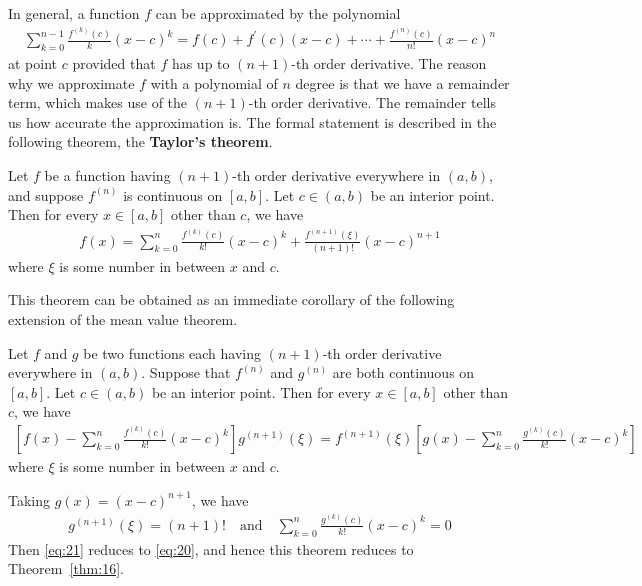 \documentclass[thmcnt=section, 12pt]{my-elegantbook}
\begin{document}

In general, a function $f$ can be approximated by the polynomial
\begin{align*}
    \sum_{k=0}^{n-1} \frac{f^{(k)}(c)}{k}(x-c)^k
    = f(c) + f^\prime(c)(x-c) + \cdots + \frac{f^{(n)}(c)}{n!} (x-c)^{n}
\end{align*}
at point $c$ provided that $f$ has up to $(n+1)$-th order derivative. The reason why we approximate $f$ with a polynomial of $n$ degree is that we have a remainder term, which makes use of the $(n+1)$-th order derivative. The remainder tells us how accurate the approximation is. The formal statement is described in the following theorem, the \textbf{Taylor's theorem}.

\begin{theorem}[Taylor] \label{thm:16}
    Let $f$ be a function having $(n+1)$-th order derivative everywhere in $(a, b)$, and suppose $f^{(n)}$ is continuous on $[a, b]$. Let $c \in (a, b)$ be an interior point. Then for every $x \in [a, b]$ other than $c$, we have 
    \begin{align}
        f(x) = \sum_{k=0}^{n} \frac{f^{(k)}(c)}{k!}(x-c)^k + \frac{f^{(n+1)}(\xi)}{(n+1)!} (x-c)^{n+1}
        \label{eq:20}
    \end{align}
    where $\xi$ is some number in between $x$ and $c$.
\end{theorem}

\par This theorem can be obtained as an immediate corollary of the following extension of the mean value theorem.

\begin{theorem} \label{thm:17}
    Let $f$ and $g$ be two functions each having $(n+1)$-th order derivative everywhere in $(a, b)$. Suppose that $f^{(n)}$ and $g^{(n)}$ are both continuous on $[a, b]$. Let $c \in (a, b)$ be an interior point. Then for every $x \in [a, b]$ other than $c$, we have 
    \begin{align}
        \left[
            f(x) - \sum_{k=0}^{n} \frac{f^{(k)}(c)}{k!}(x-c)^k
        \right] g^{(n+1)}(\xi)
        = f^{(n+1)}(\xi) \left[
            g(x) - \sum_{k=0}^{n} \frac{g^{(k)}(c)}{k!}(x-c)^k
        \right] 
        \label{eq:21}
    \end{align}
    where $\xi$ is some number in between $x$ and $c$.
\end{theorem}

\begin{remark}
    Taking $g(x) = (x-c)^{n+1}$, we have
    \begin{align*}
        g^{(n+1)}(\xi) = (n+1)!
        \quad \text{and} \quad
        \sum_{k=0}^{n} \frac{g^{(k)}(c)}{k!}(x-c)^k = 0
    \end{align*}
    Then \eqref{eq:21} reduces to \eqref{eq:20}, and hence this theorem reduces to Theorem~\ref{thm:16}.
\end{remark}
\end{document}
